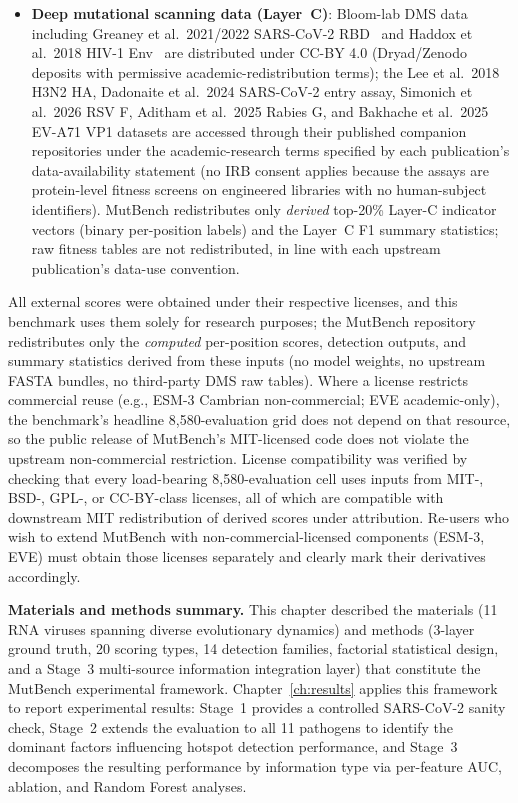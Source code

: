\begin{itemize}[leftmargin=*,itemsep=0pt]
\item \textbf{Deep mutational scanning data (Layer~C)}: Bloom-lab DMS data including Greaney et al.\ 2021/2022 SARS-CoV-2 RBD~\cite{greaney2021RBD,greaney2022spike} and Haddox et al.\ 2018 HIV-1 Env~\cite{haddox2018hiv1dms} are distributed under CC-BY 4.0 (Dryad/Zenodo deposits with permissive academic-redistribution terms); the Lee et al.\ 2018 H3N2 HA, Dadonaite et al.\ 2024 SARS-CoV-2 entry assay, Simonich et al.\ 2026 RSV F, Aditham et al.\ 2025 Rabies G, and Bakhache et al.\ 2025 EV-A71 VP1 datasets are accessed through their published companion repositories under the academic-research terms specified by each publication's data-availability statement (no IRB consent applies because the assays are protein-level fitness screens on engineered libraries with no human-subject identifiers). MutBench redistributes only \emph{derived} top-20\% Layer-C indicator vectors (binary per-position labels) and the Layer~C F1 summary statistics; raw fitness tables are not redistributed, in line with each upstream publication's data-use convention.
\end{itemize}
\noindent
All external scores were obtained under their respective licenses, and this benchmark uses them solely for research purposes; the MutBench repository redistributes only the \emph{computed} per-position scores, detection outputs, and summary statistics derived from these inputs (no model weights, no upstream FASTA bundles, no third-party DMS raw tables). Where a license restricts commercial reuse (e.g., ESM-3 Cambrian non-commercial; EVE academic-only), the benchmark's headline 8{,}580-evaluation grid does not depend on that resource, so the public release of MutBench's MIT-licensed code does not violate the upstream non-commercial restriction. License compatibility was verified by checking that every load-bearing 8{,}580-evaluation cell uses inputs from MIT-, BSD-, GPL-, or CC-BY-class licenses, all of which are compatible with downstream MIT redistribution of derived scores under attribution. Re-users who wish to extend MutBench with non-commercial-licensed components (ESM-3, EVE) must obtain those licenses separately and clearly mark their derivatives accordingly.

\bigskip
\noindent\textbf{Materials and methods summary.}
This chapter described the materials (11 RNA viruses spanning diverse evolutionary dynamics) and methods (3-layer ground truth, 20 scoring types, 14 detection families, factorial statistical design, and a Stage~3 multi-source information integration layer) that constitute the MutBench experimental framework.
Chapter~\ref{ch:results} applies this framework to report experimental results: Stage~1 provides a controlled SARS-CoV-2 sanity check, Stage~2 extends the evaluation to all 11 pathogens to identify the dominant factors influencing hotspot detection performance, and Stage~3 decomposes the resulting performance by information type via per-feature AUC, ablation, and Random Forest analyses.
